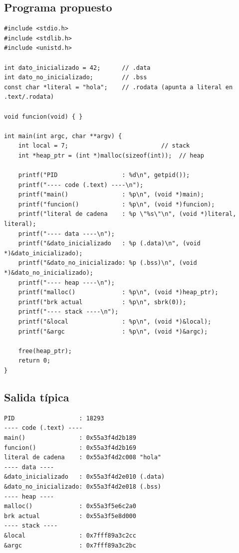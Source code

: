 \documentclass[11pt,a4paper]{article}
\begin{document}
\subsection{Programa propuesto}

\begin{lstlisting}[style=cstyle]
#include <stdio.h>
#include <stdlib.h>
#include <unistd.h>

int dato_inicializado = 42;      // .data
int dato_no_inicializado;        // .bss
const char *literal = "hola";    // .rodata (apunta a literal en .text/.rodata)

void funcion(void) { }

int main(int argc, char **argv) {
    int local = 7;                          // stack
    int *heap_ptr = (int *)malloc(sizeof(int));  // heap

    printf("PID                  : %d\n", getpid());
    printf("---- code (.text) ----\n");
    printf("main()               : %p\n", (void *)main);
    printf("funcion()            : %p\n", (void *)funcion);
    printf("literal de cadena    : %p \"%s\"\n", (void *)literal, literal);
    printf("---- data ----\n");
    printf("&dato_inicializado   : %p (.data)\n", (void *)&dato_inicializado);
    printf("&dato_no_inicializado: %p (.bss)\n", (void *)&dato_no_inicializado);
    printf("---- heap ----\n");
    printf("malloc()             : %p\n", (void *)heap_ptr);
    printf("brk actual           : %p\n", sbrk(0));
    printf("---- stack ----\n");
    printf("&local               : %p\n", (void *)&local);
    printf("&argc                : %p\n", (void *)&argc);

    free(heap_ptr);
    return 0;
}
\end{lstlisting}

\subsection{Salida típica}

\begin{lstlisting}[style=textstyle]
PID                  : 18293
---- code (.text) ----
main()               : 0x55a3f4d2b189
funcion()            : 0x55a3f4d2b169
literal de cadena    : 0x55a3f4d2c008 "hola"
---- data ----
&dato_inicializado   : 0x55a3f4d2e010 (.data)
&dato_no_inicializado: 0x55a3f4d2e018 (.bss)
---- heap ----
malloc()             : 0x55a3f5e6c2a0
brk actual           : 0x55a3f5e8d000
---- stack ----
&local               : 0x7fff89a3c2cc
&argc                : 0x7fff89a3c2bc
\end{lstlisting}
\end{document}
